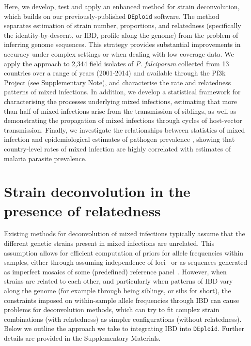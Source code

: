 \documentclass[9pt,lineno]{elife}
\begin{document}

Here, we develop, test and apply an enhanced method for strain deconvolution, which builds on our previously-published \texttt{DEploid} software.  The method separates estimation of strain number, proportions, and relatedness (specifically the identity-by-descent, or IBD, profile along the genome) from the problem of inferring genome sequences. This strategy provides substantial improvements in accuracy under complex settings or when dealing with low coverage data.  We apply the approach to 2,344 field isolates of {\it P. falciparum} collected from 13 countries over a range of years (2001-2014) and available through the Pf3k Project (see Supplementary Note), and characterise the rate and relatedness patterns of mixed infections.  In addition, we develop a statistical framework for characterising the processes underlying mixed infections, estimating that more than half of mixed infections arise from the transmission of siblings, as well as demonstrating the propagation of mixed infections through cycles of host-vector transmission.  Finally, we investigate the relationships between statistics of mixed infection and epidemiological estimates of pathogen prevalence \citep{MAP2017}, showing that country-level rates of mixed infection are highly correlated with estimates of malaria parasite prevalence.

\section{Strain deconvolution in the presence of relatedness}

Existing methods for deconvolution of mixed infections typically assume that the different genetic strains present in mixed infections are unrelated.  This assumption allows for efficient computation of priors for allele frequencies within samples, either through assuming independence of loci~\citep{Jack2016} or as sequences generated as imperfect mosaics of some (predefined) reference panel~\citep{Zhu2017}.  However, when strains are related to each other, and particularly when patterns of IBD vary along the genome (for example through being siblings, or sibs for short), the constraints imposed on within-sample allele frequencies through IBD can cause problems for deconvolution methods, which can try to fit complex strain combinations (with relatedness) as simpler configurations (without relatedness).  Below we outline the approach we take to integrating IBD into \texttt{DEploid}.  Further details are provided in the Supplementary Materials.
\end{document}
